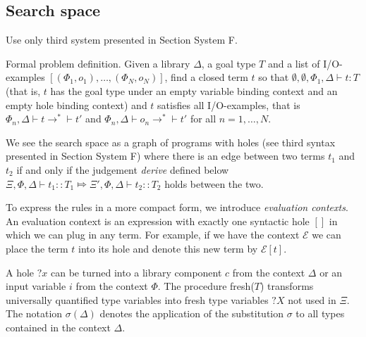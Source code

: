 \subsection{Search space}\label{Search space}
Use only third system presented in Section System F.

Formal problem definition. Given a library $\Delta$, a goal type $T$ and a list of I/O-examples $[(\Phi_1, o_1), \ldots , (\Phi_N, o_N)]$, find a closed term $t$ so that $\emptyset, \emptyset, \Phi_1, \Delta \vdash t : T$ (that is, $t$ has the goal type under an empty variable binding context and an empty hole binding context) and $t$ satisfies all I/O-examples, that is $\Phi_n, \Delta \vdash t \longrightarrow^* \vdash t'$ and $\Phi_n, \Delta \vdash o_n \longrightarrow^* \vdash t'$ for all $n = 1, \ldots, N$.

We see the search space as a graph of programs with holes (see third syntax presented in Section System F) where there is an edge between two terms $t_1$ and $t_2$ if and only if the judgement \emph{derive} defined below $\Xi, \Phi, \Delta \vdash t_1 :: T_1 \Mapsto \Xi', \Phi, \Delta \vdash t_2 :: T_2$ holds between the two.

To express the rules in a more compact form, we introduce \emph{evaluation contexts}. An evaluation context is an expression with exactly one syntactic hole $[]$ in which we can plug in any term. For example, if we have the context $\mathcal{E}$ we can place the term $t$ into its hole and denote this new term by $\mathcal{E}[t]$.

A hole $?x$ can be turned into a library component $c$ from the context $\Delta$ or an input variable $i$ from the context $\Phi$. The procedure fresh($T$) transforms universally quantified type variables into fresh type variables $?X$ not used in $\Xi$.
The notation $\sigma(\Delta)$ denotes the application of the substitution $\sigma$ to all types contained in the context $\Delta$.

\begin{prooftree}
\end{prooftree}

\begin{prooftree}
\end{prooftree}


